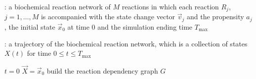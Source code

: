 \begin{algorithm}[H]
\DontPrintSemicolon
{}

\caption{\protect\TitleFunction{}}
\label{algo:sdm}

\Input: a biochemical reaction network of $M$ reactions in which each reaction $R_j$, $j=1, \dots, M$ is accompanied with the state change vector $\vec{v}_j$ and the propensity $a_j$, the initial state $\vec{x}_0$ at time $0$ and the simulation ending time $T_{\max}$\;

\Output: a trajectory of the biochemical reaction network, which is a collection of states $X(t)$ for time $0\le t\le T_{\max}$\;

$t = 0$\;
$\vec{X} = \vec{x}_0$\;
build the reaction dependency graph $G$\;

\end{algorithm}
